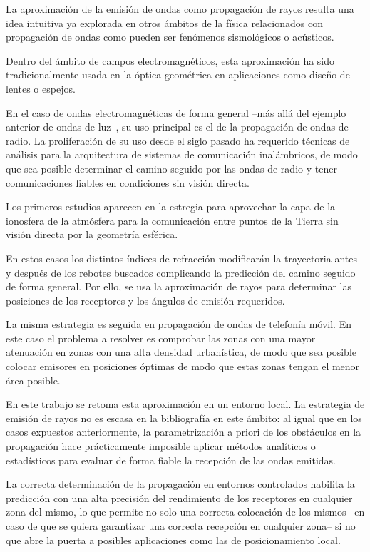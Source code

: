 La aproximación de la emisión de ondas como propagación de rayos resulta una idea intuitiva ya explorada en otros ámbitos de la física relacionados con propagación de ondas como pueden ser fenómenos sismológicos o acústicos.

Dentro del ámbito de campos electromagnéticos, esta aproximación ha sido tradicionalmente usada en la óptica geométrica en aplicaciones como diseño de lentes o espejos.

En el caso de ondas electromagnéticas de forma general --más allá del ejemplo anterior de ondas de luz--, su uso principal es el de la propagación de ondas de radio.
La proliferación de su uso desde el siglo pasado ha requerido técnicas de análisis para la arquitectura de sistemas de comunicación inalámbricos, de modo que sea posible determinar el camino seguido por las ondas de radio y tener comunicaciones fiables en condiciones sin visión directa.

Los primeros estudios aparecen en la estregia para aprovechar la capa de la ionosfera de la atmósfera para la comunicación entre puntos de la Tierra sin visión directa por la geometría esférica.

En estos casos los distintos índices de refracción modificarán la trayectoria antes y después de los rebotes buscados complicando la predicción del camino seguido de forma general.
Por ello, se usa la aproximación de rayos para determinar las posiciones de los receptores y los ángulos de emisión requeridos.

La misma estrategia es seguida en propagación de ondas de telefonía móvil.
En este caso el problema a resolver es comprobar las zonas con una mayor atenuación en zonas con una alta densidad urbanística, de modo que sea posible colocar emisores en posiciones óptimas de modo que estas zonas tengan el menor área posible.

En este trabajo se retoma esta aproximación en un entorno local.
La estrategia de emisión de rayos no es escasa en la bibliografía en este ámbito: al igual que en los casos expuestos anteriormente, la parametrización a priori de los obstáculos en la propagación hace prácticamente imposible aplicar métodos analíticos o estadísticos para evaluar de forma fiable la recepción de las ondas emitidas.

La correcta determinación de la propagación en entornos controlados habilita la predicción con una alta precisión del rendimiento de los receptores en cualquier zona del mismo, lo que permite no solo una correcta colocación de los mismos --en caso de que se quiera garantizar una correcta recepción en cualquier zona-- si no que abre la puerta a posibles aplicaciones como las de posicionamiento local.


